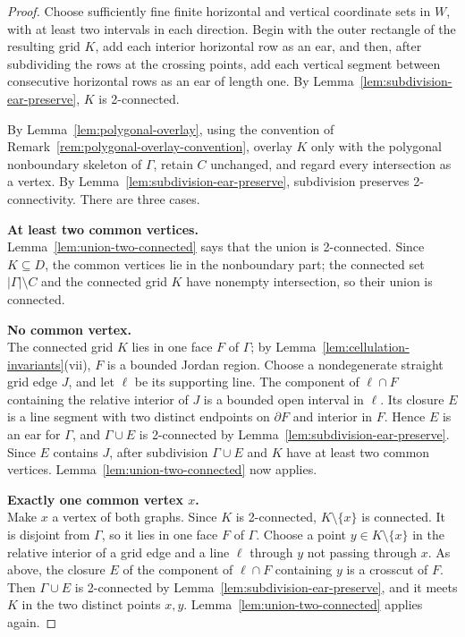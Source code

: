 \documentclass[11pt]{article}
\theoremstyle{mainplain}
\theoremstyle{mainroman}
\theoremstyle{definition}
\numberwithin{equation}{section}
\begin{document}
\begin{proof}
Choose sufficiently fine finite horizontal and vertical coordinate sets in \(W\), with at least two intervals in each direction. Begin with the outer rectangle of the resulting grid \(K\), add each interior horizontal row as an ear, and then, after subdividing the rows at the crossing points, add each vertical segment between consecutive horizontal rows as an ear of length one. By Lemma~\ref{lem:subdivision-ear-preserve}, \(K\) is 2-connected.

By Lemma~\ref{lem:polygonal-overlay}, using the convention of
Remark~\ref{rem:polygonal-overlay-convention}, overlay $K$ only with the
polygonal nonboundary skeleton of $\Gamma$, retain $C$ unchanged, and
regard every intersection as a vertex. By Lemma~\ref{lem:subdivision-ear-preserve}, subdivision preserves 2-connectivity. There are three cases.

\textbf{At least two common vertices.}\\
Lemma~\ref{lem:union-two-connected} says that the union is 2-connected. Since \(K\subseteq D\), the common vertices lie in the nonboundary part; the connected set \(|\Gamma|\setminus C\) and the connected grid \(K\) have nonempty intersection, so their union is connected.

\textbf{No common vertex.}\\
The connected grid \(K\) lies in one face \(F\) of \(\Gamma\); by
Lemma~\ref{lem:cellulation-invariants}\textup{(vii)}, \(F\) is a
bounded Jordan region. Choose a nondegenerate straight grid edge \(J\), and let \(\ell\) be its supporting line. The component of \(\ell\cap F\) containing the relative interior of \(J\) is a bounded open interval in \(\ell\). Its closure \(E\) is a line segment with two distinct endpoints on \(\partial F\) and interior in \(F\). Hence \(E\) is an ear for \(\Gamma\), and \(\Gamma\cup E\) is 2-connected by Lemma~\ref{lem:subdivision-ear-preserve}. Since \(E\) contains \(J\), after subdivision \(\Gamma\cup E\) and \(K\) have at least two common vertices. Lemma~\ref{lem:union-two-connected} now applies.

\textbf{Exactly one common vertex \(x\).}\\
Make \(x\) a vertex of both graphs. Since \(K\) is 2-connected, \(K\setminus\{x\}\) is connected. It is disjoint from \(\Gamma\), so it lies in one face \(F\) of \(\Gamma\). Choose a point \(y\in K\setminus\{x\}\) in the relative interior of a grid edge and a line \(\ell\) through \(y\) not passing through \(x\). As above, the closure \(E\) of the component of \(\ell\cap F\) containing \(y\) is a crosscut of \(F\). Then \(\Gamma\cup E\) is 2-connected by Lemma~\ref{lem:subdivision-ear-preserve}, and it meets \(K\) in the two distinct points \(x,y\). Lemma~\ref{lem:union-two-connected} applies again.


\end{proof}
\end{document}
